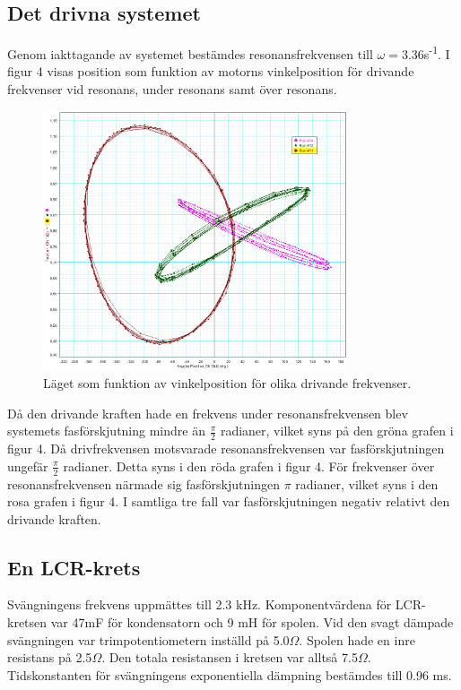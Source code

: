 \documentclass[a4paper,10pt]{article}
\begin{document}
\subsection{Det drivna systemet}
Genom iakttagande av systemet bestämdes resonansfrekvensen till $\omega=3.36$s\textsuperscript{-1}. I figur 4 visas position som funktion av motorns vinkelposition för drivande frekvenser vid resonans, under resonans samt över resonans.
\begin{figure}[H]
	\centering
	\includegraphics[width=0.8\textwidth]{../bilder/pos_vs_ang_uppg2b.png}
	\caption{Läget som funktion av vinkelposition för olika drivande frekvenser.}
\end{figure}
Då den drivande kraften hade en frekvens under resonansfrekvensen blev systemets fasförskjutning mindre än $\frac{\pi}{2}$ radianer, vilket syns på den gröna grafen i figur 4. Då drivfrekvensen motsvarade resonansfrekvensen var fasförskjutningen ungefär $\frac{\pi}{2}$ radianer. Detta syns i den röda grafen i figur 4. För frekvenser över resonansfrekvensen närmade sig fasförskjutningen $\pi$ radianer, vilket syns i den rosa grafen i figur 4. I samtliga tre fall var fasförskjutningen negativ relativt den drivande kraften.

\subsection{En LCR-krets}
Svängningens frekvens uppmättes till 2.3 kHz. Komponentvärdena för LCR-kretsen var 47mF för kondensatorn och 9 mH för spolen. Vid den svagt dämpade svängningen var trimpotentiometern inställd på 5.0$\Omega$. Spolen hade en inre resistans på 2.5$\Omega$. Den totala resistansen i kretsen var alltså 7.5$\Omega$. Tidskonstanten för svängningens exponentiella dämpning bestämdes till 0.96 ms.
\end{document}
